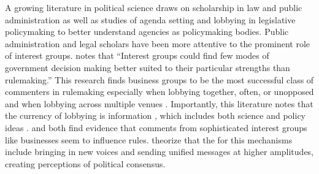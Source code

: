 A growing literature in political science draws on scholarship in law and public administration as well as studies of agenda setting and lobbying in legislative policymaking to better understand agencies as policymaking bodies. Public administration and legal scholars have been more attentive to the prominent role of interest groups. \citet{Kerwin2011} notes that ``Interest groups could find few modes of government decision making better suited to their particular strengths than rulemaking.'' This research finds business groups to be the most successful class of commenters in rulemaking \citep{Yackee2006JOP} especially when lobbying together, often, or unopposed \citep{Nelson2012} and when lobbying across multiple venues \citep{Yackee2015JPART}. Importantly, this literature notes that the currency of lobbying is information \citep{Hall2006, Carpenter1998, Yackee2006JPART, Yackee2012}, which includes both science and policy ideas \citep{Jones2005}. \citet{Kirilenko2014} and \citet{Yackee2006JOP} both find evidence that comments from sophisticated interest groups like businesses seem to influence rules. %
\citet{Yackee2006JOP} theorize that the for this mechanisms include bringing in new voices and sending unified messages at higher amplitudes, creating perceptions of political consensus.





